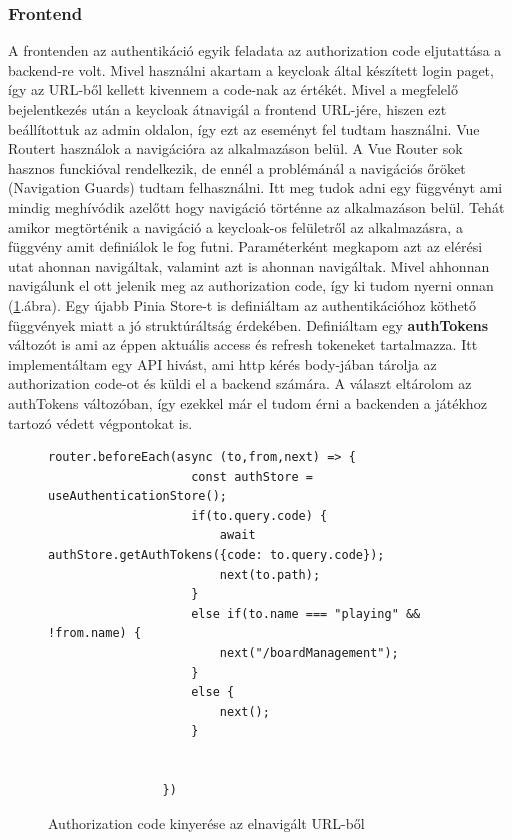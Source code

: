 \documentclass[a4paper,twoside]{article}
\begin{document}
\subsubsection{Frontend}
A frontenden az authentikáció egyik feladata az authorization code eljutattása a backend-re volt. Mivel használni akartam a keycloak által 
készített login paget, így az URL-ből kellett kivennem a code-nak az értékét. Mivel a megfelelő bejelentkezés után a keycloak átnavigál a frontend 
URL-jére, hiszen ezt beállítottuk az admin oldalon, így ezt az eseményt fel tudtam használni. Vue Routert használok a navigációra az alkalmazáson belül. A Vue Router 
sok hasznos funckióval rendelkezik, de ennél a problémánál a navigációs őröket (Navigation Guards) tudtam felhasználni. Itt meg tudok adni egy függvényt ami
mindig meghívódik azelőtt hogy navigáció történne az alkalmazáson belül. Tehát amikor megtörténik a navigáció a keycloak-os felületről az alkalmazásra, a függvény amit 
definiálok le fog futni. Paraméterként megkapom azt az elérési utat ahonnan navigáltak, valamint azt is ahonnan navigáltak. Mivel ahhonnan navigálunk el ott jelenik meg az
authorization code, így ki tudom nyerni onnan (\ref{authCode}.ábra). Egy újabb Pinia Store-t is definiáltam az authentikációhoz köthető függvények miatt a jó struktúráltság érdekében. Definiáltam egy \textbf{authTokens} változót is ami az éppen aktuális access és refresh tokeneket tartalmazza. Itt implementáltam egy API hivást, ami http kérés body-jában tárolja az authorization code-ot és küldi el a backend számára. A választ eltárolom az authTokens változóban, így ezekkel már el tudom érni a backenden a játékhoz tartozó védett végpontokat is. 
\begin{figure}
	\caption{Authorization code kinyerése az elnavigált URL-ből}
	\begin{adjustwidth}{0cm}{10cm}
		\begin{minipage}{\textwidth}
			\begin{lstlisting}[style=javascriptStyle]
				router.beforeEach(async (to,from,next) => {
					const authStore = useAuthenticationStore();
					if(to.query.code) {
						await authStore.getAuthTokens({code: to.query.code});
						next(to.path);
					}
					else if(to.name === "playing" && !from.name) {
						next("/boardManagement");
					}
					else {
						next();
					}
					
					
				})
			\end{lstlisting}
		\end{minipage}
	\end{adjustwidth}
	\label{authCode}
\end{figure}
\end{document}

